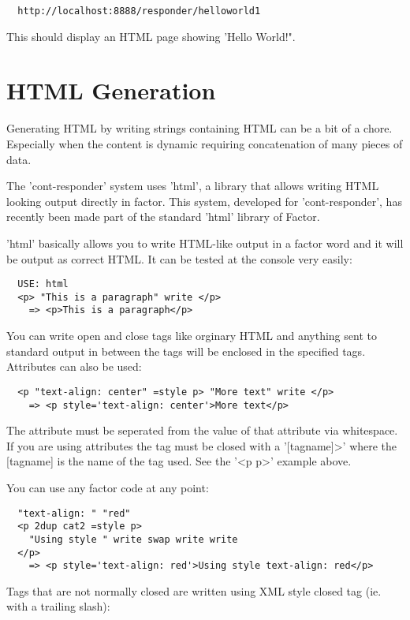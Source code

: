 \begin{verbatim}
  http://localhost:8888/responder/helloworld1
\end{verbatim}

This should display an HTML page showing 'Hello World!".

\section{HTML Generation}

Generating HTML by writing strings containing HTML can be a bit of a
chore. Especially when the content is dynamic requiring concatenation
of many pieces of data. 

The 'cont-responder' system uses 'html', a library that allows writing
HTML looking output directly in factor. This system, developed for
'cont-responder', has recently been made part of the standard 'html'
library of Factor.

'html' basically allows you to write HTML-like output in a factor word
and it will be output as correct HTML. It can be tested at the console
very easily:

\begin{verbatim}
  USE: html
  <p> "This is a paragraph" write </p>
    => <p>This is a paragraph</p>
\end{verbatim}

You can write open and close tags like orginary HTML and anything sent
to standard output in between the tags will be enclosed in the
specified tags. Attributes can also be used:

\begin{verbatim}
  <p "text-align: center" =style p> "More text" write </p>
    => <p style='text-align: center'>More text</p>
\end{verbatim}

The attribute must be seperated from the value of that attribute via
whitespace. If you are using attributes the tag must be closed with a
'[tagname]>' where the [tagname] is the name of the tag used. See the
'<p p>' example above.

You can use any factor code at any point:
 
\begin{verbatim}
  "text-align: " "red" 
  <p 2dup cat2 =style p> 
    "Using style " write swap write write
  </p>
    => <p style='text-align: red'>Using style text-align: red</p>
\end{verbatim}

Tags that are not normally closed are written using XML style closed
tag (ie. with a trailing slash):

